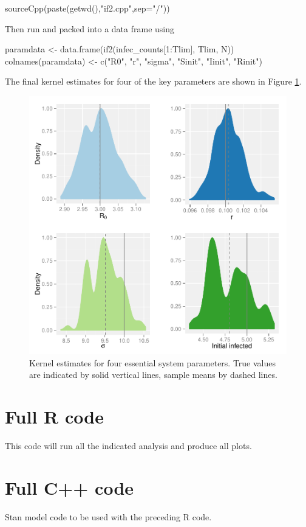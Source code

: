 \documentclass[12pt]{article}
\begin{document}
    \begin{R}
    sourceCpp(paste(getwd(),"if2.cpp",sep="/"))
    \end{R}

    Then run and packed into a data frame using

    \begin{R}
    paramdata <- data.frame(if2(infec_counts[1:Tlim], Tlim, N))
	  colnames(paramdata) <- c("R0", "r", "sigma", "Sinit", "Iinit", "Rinit")
    \end{R}

    The final kernel estimates for four of the key parameters are shown in Figure \ref{kernelplot}.

    \begin{figure}[H]
        \centering
        \includegraphics[width=\textwidth]{./images/if2kernels.pdf}
        \caption{Kernel estimates for four essential system parameters. True values are indicated by solid vertical lines, sample means by dashed lines.}
        \label{kernelplot}
    \end{figure}


\newpage
\begin{appendices}

	\section{Full R code}

    This code will run all the indicated analysis and produce all plots.

    

    \section{Full C++ code}

    Stan model code to be used with the preceding R code.

    

\end{appendices}
\end{document}

